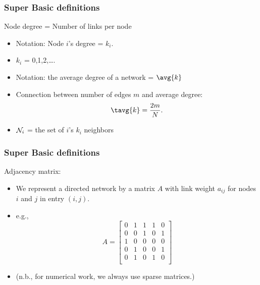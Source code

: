 \begin{frame}
  \frametitle{Super Basic definitions}

  \begin{block}{\alert{Node degree} = Number of links per node}
    \begin{itemize}
    \item<2-> Notation: Node $i$'s degree = $k_i$.
    \item<3-> $k_i$ = 0,1,2,\ldots.
    \item<4-> Notation: the average degree of a network = $\avg{k}$ \\
    \item<6->
      Connection between number of edges $m$ and average degree:
      $$
      \tavg{k} = \frac{2m}{N}.
      $$
    \item<7->
       ${\cal N}_i$ = the set of $i$'s $k_i$ neighbors
    \end{itemize}
  \end{block}

\end{frame}

\begin{frame}
  \frametitle{Super Basic definitions}

  \begin{block}{Adjacency matrix:}
    \begin{itemize}
    \item<1->
      We represent a directed network by a 
      matrix $A$ with link weight $a_{ij}$ for nodes $i$ and $j$
      in entry $(i,j)$.
    \item<2->
      e.g.,
      $$
      A = \left[
        \begin{array}{ccccc}
          0 & 1 & 1 & 1 & 0\\
          0 & 0 & 1 & 0 & 1\\
          1 & 0 & 0 & 0 & 0 \\
          0 & 1 & 0 & 0 & 1 \\
          0 & 1 & 0 & 1 & 0 \\
        \end{array}
      \right]
      $$
    \item<3->
      (n.b., for numerical work, we 
      always use sparse matrices.)
    \end{itemize}
  \end{block}

\end{frame}


